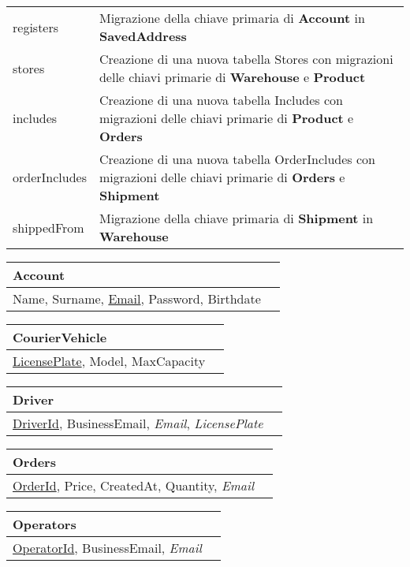 \begin{tabularx}{\textwidth}{YY}
    registers & Migrazione della chiave primaria di \textbf{Account} in \textbf{SavedAddress} \\
    stores & Creazione di una nuova tabella Stores con migrazioni delle chiavi primarie di \textbf{Warehouse} e \textbf{Product} \\
    includes & Creazione di una nuova tabella Includes con migrazioni delle chiavi primarie di \textbf{Product} e \textbf{Orders} \\
    orderIncludes & Creazione di una nuova tabella OrderIncludes con migrazioni delle chiavi primarie di \textbf{Orders} e \textbf{Shipment} \\
    shippedFrom & Migrazione della chiave primaria di \textbf{Shipment} in \textbf{Warehouse} \\
    \bottomrule
\end{tabularx}

\newpage

\begin{tabularx}{\textwidth}{YY}
    \toprule
    \textbf{Account} \\
    \midrule
    Name, Surname, \underline{Email}, Password, Birthdate \\
    \bottomrule
\end{tabularx}

\begin{tabularx}{\textwidth}{YY}
    \toprule
    \textbf{CourierVehicle} \\
    \midrule
    \underline{LicensePlate}, Model, MaxCapacity  \\
    \bottomrule
\end{tabularx}

\begin{tabularx}{\textwidth}{YY}
    \toprule
    \textbf{Driver} \\
    \midrule
    \underline{DriverId}, BusinessEmail, \textit{Email}, \textit{LicensePlate} \\
    \bottomrule
\end{tabularx}

\begin{tabularx}{\textwidth}{YY}
    \toprule
    \textbf{Orders} \\
    \midrule
    \underline{OrderId}, Price, CreatedAt, Quantity, \textit{Email} \\
    \bottomrule
\end{tabularx}

\begin{tabularx}{\textwidth}{YY}
    \toprule
    \textbf{Operators} \\
    \midrule
    \underline{OperatorId}, BusinessEmail, \textit{Email} \\
    \bottomrule
\end{tabularx}

